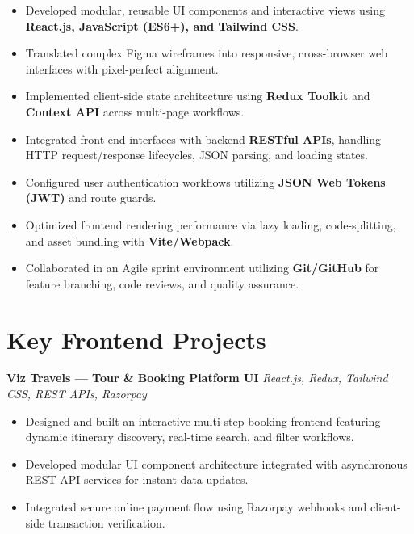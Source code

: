 \documentclass[a4paper,10pt]{article}
\begin{document}
\begin{itemize}

    \item Developed modular, reusable UI components and interactive views using \textbf{React.js, JavaScript (ES6+), and Tailwind CSS}.

    \item Translated complex Figma wireframes into responsive, cross-browser web interfaces with pixel-perfect alignment.

    \item Implemented client-side state architecture using \textbf{Redux Toolkit} and \textbf{Context API} across multi-page workflows.

    \item Integrated front-end interfaces with backend \textbf{RESTful APIs}, handling HTTP request/response lifecycles, JSON parsing, and loading states.

    \item Configured user authentication workflows utilizing \textbf{JSON Web Tokens (JWT)} and route guards.

    \item Optimized frontend rendering performance via lazy loading, code-splitting, and asset bundling with \textbf{Vite/Webpack}.

    \item Collaborated in an Agile sprint environment utilizing \textbf{Git/GitHub} for feature branching, code reviews, and quality assurance.

\end{itemize}

\section*{Key Frontend Projects}

\textbf{Viz Travels --- Tour \& Booking Platform UI}
\hfill
\textit{React.js, Redux, Tailwind CSS, REST APIs, Razorpay}

\begin{itemize}

    \item Designed and built an interactive multi-step booking frontend featuring dynamic itinerary discovery, real-time search, and filter workflows.

    \item Developed modular UI component architecture integrated with asynchronous REST API services for instant data updates.

    \item Integrated secure online payment flow using Razorpay webhooks and client-side transaction verification.

\end{itemize}
\end{document}
